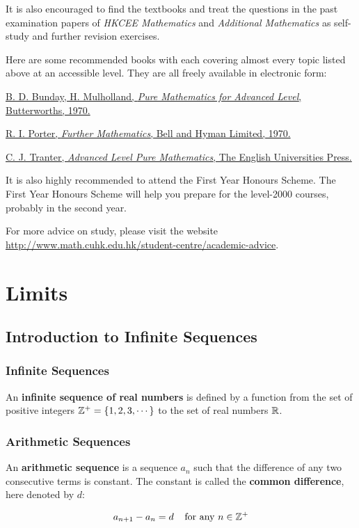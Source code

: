 \documentclass[a4paper,12pt]{article}
\begin{document}
It is also encouraged to find the textbooks and treat the questions in the past examination papers of \textit{HKCEE Mathematics} and \textit{Additional Mathematics} as self-study and further revision exercises.\n

Here are some recommended books with each covering almost every topic listed above at an accessible level. They are all freely available in electronic form:

\begin{rlist}
  \item \href{https://archive.org/details/PureMathematicsForAdvancedLevel}{B. D. Bunday, H. Mulholland, \textit{Pure Mathematics for Advanced Level}, Butterworths, 1970.}
  \item \href{https://archive.org/details/FurtherMathematics}{R. I. Porter, \textit{Further Mathematics}, Bell and Hyman Limited, 1970.}
  \item \href{https://archive.org/details/in.ernet.dli.2015.285850}{C. J. Tranter, \textit{Advanced Level Pure Mathematics}, The English Universities Press.}
\end{rlist}

It is also highly recommended to attend the First Year Honours Scheme. The First Year Honours Scheme will help you prepare for the level-2000 courses, probably in the second year.\n

For more advice on study, please visit the website \url{http://www.math.cuhk.edu.hk/student-centre/academic-advice}.

\pagebreak

\fancyhead[R]{\nouppercase \lastrightmark}
\section{Limits}
\subsection{Introduction to Infinite Sequences}
\subsubsection{Infinite Sequences}
\begin{dft}
  An \textbf{infinite sequence of real numbers} is defined by a function from the set of positive integers $\mathbb{Z}^{+}=\left\{ 1,2,3,\cdots\right\}$ to the set of real numbers $\mathbb{R}$.
\end{dft}

\subsubsection{Arithmetic Sequences}
\begin{dft}
  An \textbf{arithmetic sequence} is a sequence $a_{n}$ such that the difference of any two consecutive terms is constant. The constant is called the \textbf{common difference}, here denoted by $d$:

  $$a_{n+1}-a_{n}=d\;\;\;\;\text{for any }n\in\mathbb{Z}^{+}$$
\end{dft}\n
\end{document}
